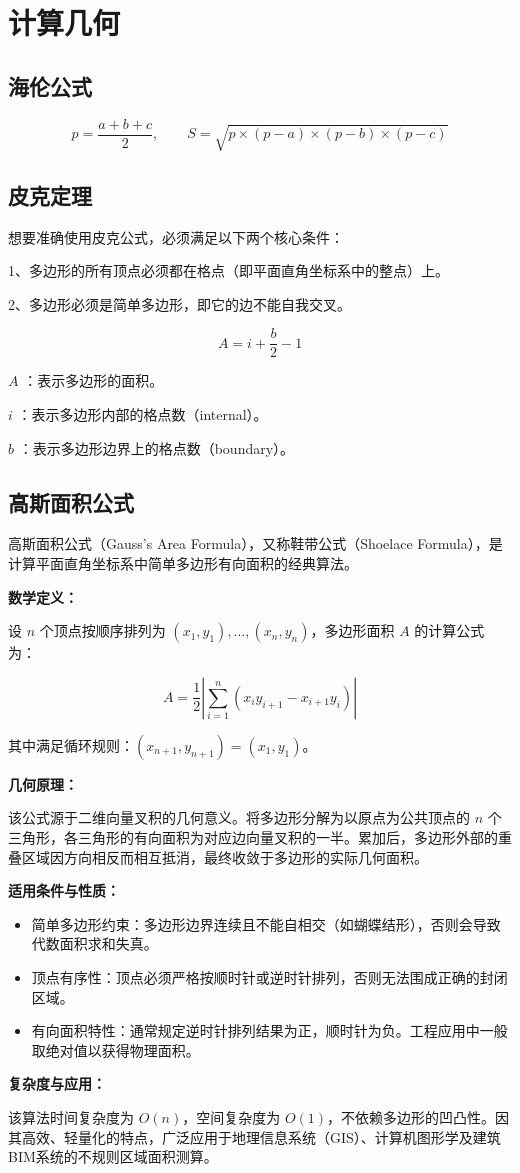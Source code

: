 \section{计算几何}

\subsection{海伦公式}

\[
  p = \frac{a + b + c}{2},\qquad
  S = \sqrt{p\times(p - a)\times(p-b)\times(p-c)}
\]

\subsection{皮克定理}

想要准确使用皮克公式，必须满足以下两个核心条件：

1、多边形的所有顶点必须都在格点（即平面直角坐标系中的整点）上。

2、多边形必须是简单多边形，即它的边不能自我交叉。

$$ A = i + \frac{b}{2} - 1 $$

$A$ ：表示多边形的面积。

$i$ ：表示多边形内部的格点数（internal）。

$b$ ：表示多边形边界上的格点数（boundary）。

\subsection{高斯面积公式}

高斯面积公式（Gauss's Area Formula），又称鞋带公式（Shoelace Formula），是计算平面直角坐标系中简单多边形有向面积的经典算法。

\textbf{数学定义：}

设 $n$ 个顶点按顺序排列为 $(x_1, y_1), \dots, (x_n, y_n)$，多边形面积 $A$ 的计算公式为：

$$ A = \frac{1}{2} \left| \sum_{i=1}^{n} (x_i y_{i+1} - x_{i+1} y_i) \right| $$

其中满足循环规则：$(x_{n+1}, y_{n+1}) = (x_1, y_1)$。

\textbf{几何原理：}

该公式源于二维向量叉积的几何意义。将多边形分解为以原点为公共顶点的 $n$ 个三角形，各三角形的有向面积为对应边向量叉积的一半。累加后，多边形外部的重叠区域因方向相反而相互抵消，最终收敛于多边形的实际几何面积。

\textbf{适用条件与性质：}

\begin{itemize}
  \item 简单多边形约束：多边形边界连续且不能自相交（如蝴蝶结形），否则会导致代数面积求和失真。
  \item 顶点有序性：顶点必须严格按顺时针或逆时针排列，否则无法围成正确的封闭区域。
  \item 有向面积特性：通常规定逆时针排列结果为正，顺时针为负。工程应用中一般取绝对值以获得物理面积。
\end{itemize}

\textbf{复杂度与应用：}

该算法时间复杂度为 $O(n)$，空间复杂度为 $O(1)$，不依赖多边形的凹凸性。因其高效、轻量化的特点，广泛应用于地理信息系统（GIS）、计算机图形学及建筑BIM系统的不规则区域面积测算。
